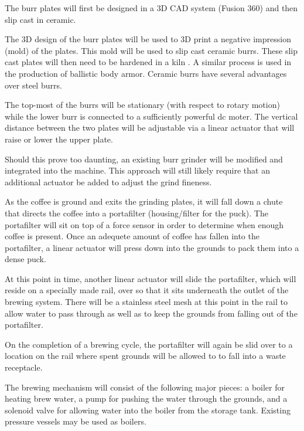 \documentclass[conference]{IEEEtran}
\begin{document}
The burr plates will first be designed in a 3D CAD system (Fusion 360) and then slip cast
in ceramic.

The 3D design of the burr plates will be used to 3D print a negative impression (mold) of the plates.
This mold will be used to slip cast
ceramic burrs. These slip cast plates will then need
to be hardened in a kiln \cite{slip}. A similar process is used in the
production of ballistic body armor. Ceramic burrs have several advantages over
steel burrs.

The top-most of the burrs will be stationary (with respect to rotary motion)
while the lower burr is connected to a sufficiently powerful dc moter. The
vertical distance between the two plates will be adjustable via a linear
actuator that will raise or lower the upper plate.

Should this prove too daunting, an existing burr grinder will be modified
and integrated into the machine. This approach will still likely require that an
additional actuator be added to adjust the grind fineness.

As the coffee is ground and exits the grinding plates, it will fall down a chute
that directs the coffee into a portafilter (housing/filter for the puck). The
portafilter will sit on top of a force sensor in order to determine when
enough coffee is present. Once an adequete amount of coffee has fallen into the
portafilter, a linear actuator will press down into the grounds to pack them
into a dense puck.

At this point in time, another linear actuator will slide the portafilter, which
will reside on a specially made rail, over so that it sits underneath the outlet
of the brewing system. There will be a stainless steel mesh at this point in the
rail to allow water to pass through as well as to keep the grounds from falling
out of the portafilter.

On the completion of a brewing cycle, the portafilter will again be slid over to
a location on the rail where spent grounds will be allowed to to fall into a
waste receptacle.

The brewing mechanism will consist of the following major pieces: a boiler for
heating brew water, a pump for pushing the water
through the grounds, and a solenoid valve for allowing water into the boiler from the storage tank.
Existing pressure vessels may be used as boilers.
\end{document}
